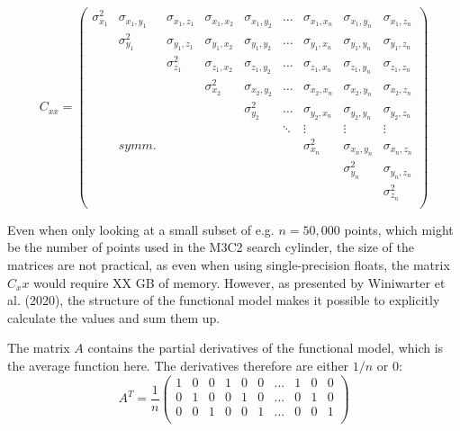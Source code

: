 \documentclass[preprint,12pt,3p]{elsarticle}
\begin{document}
\begin{equation}
C_{xx} = 
    \begin{pmatrix}
    \sigma_{x_1}^2 & \sigma_{x_1, y_1} & \sigma_{x_1, z_1} &  \sigma_{x_1, x_2} & \sigma_{x_1, y_2} & \dots & \sigma_{x_1, x_n} & \sigma_{x_1, y_n} & \sigma_{x_1, z_n}  \\
    
    
     & \sigma_{y_1}^2 & \sigma_{y_1, z_1} &  \sigma_{y_1, x_2} & \sigma_{y_1, y_2} & \dots & \sigma_{y_1, x_n} & \sigma_{y_1, y_n} & \sigma_{y_1, z_n}  \\
    
    
     &  & \sigma_{z_1}^2 &  \sigma_{z_1, x_2} & \sigma_{z_1, y_2} & \dots & \sigma_{z_1, x_n}& \sigma_{z_1, y_n} & \sigma_{z_1, z_n}  \\
    
    
     &  &  & \sigma_{x_2}^2 &  \sigma_{x_2, y_2}  & \dots & \sigma_{x_2, x_n}& \sigma_{x_2, y_n} & \sigma_{x_2, z_n}  \\
     &  &  & & \sigma_{y_2}^2 & \dots & \sigma_{y_2, x_n}& \sigma_{y_2, y_n} & \sigma_{y_2, z_n}  \\
     
    
     &  &  &  & & \ddots & \vdots & \vdots & \vdots 
     \\
     &symm. & & & & & \sigma_{x_n}^2 & \sigma_{x_n, y_n} & \sigma_{x_n, z_n} \\
     &  &  &  & & &  & \sigma_{y_n}^2 & \sigma_{y_n, z_n} \\
     &  &  &  & & &  &  & \sigma_{z_n}^2 \\
    \end{pmatrix}
    \label{eq:C_xx}
\end{equation}

Even when only looking at a small subset of e.g. $n=50,000$ points, which might be the number of points used in the M3C2 search cylinder, the size of the matrices are not practical, as even when using single-precision floats, the matrix $C_xx$ would require XX GB of memory. 
However, as presented by Winiwarter et al. (2020), the structure of the functional model makes it possible to explicitly calculate the values and sum them up.

The matrix $A$ contains the partial derivatives of the functional model, which is the average function here. The derivatives therefore are either $1/n$ or $0$:
\begin{equation}
    A^T = \frac{1}{n} \begin{pmatrix}
        1 & 0 & 0 & 1 & 0 & 0 & \dots & 1 & 0 & 0 \\
        0 & 1 & 0 & 0 & 1 & 0 &  \dots & 0 & 1 & 0 \\
        0 & 0 & 1 & 0 & 0 & 1 &\dots & 0 & 0 & 1 \\
    \end{pmatrix}
    \label{eqn:F}
\end{equation}
\end{document}
